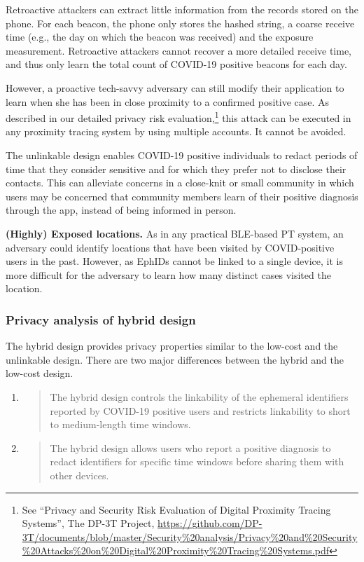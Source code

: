 \documentclass{article}
\begin{document}
Retroactive attackers can extract little information from the records
stored on the phone. For each beacon, the phone only stores the hashed
string, a coarse receive time (e.g., the day on which the beacon was
received) and the exposure measurement. Retroactive attackers cannot
recover a more detailed receive time, and thus only learn the total
count of COVID-19 positive beacons for each day.

However, a proactive tech-savvy adversary can still modify their
application to learn when she has been in close proximity to a confirmed
positive case. As described in our detailed privacy risk
evaluation,\footnote{See ``Privacy and Security Risk Evaluation of
  Digital Proximity Tracing Systems'', The DP-3T Project,
  \href{https://github.com/DP-3T/documents/blob/master/Security\%20analysis/Privacy\%20and\%20Security\%20Attacks\%20on\%20Digital\%20Proximity\%20Tracing\%20Systems.pdf}{{https://github.com/DP-3T/documents/blob/master/Security\%20analysis/Privacy\%20and\%20Security\%20Attacks\%20on\%20Digital\%20Proximity\%20Tracing\%20Systems.pdf}}}
this attack can be executed in any proximity tracing system by using
multiple accounts. It cannot be avoided.

The unlinkable design enables COVID-19 positive individuals to redact
periods of time that they consider sensitive and for which they prefer
not to disclose their contacts. This can alleviate concerns in a
close-knit or small community in which users may be concerned that
community members learn of their positive diagnosis through the app,
instead of being informed in person.

\textbf{(Highly) Exposed locations.} As in any practical BLE-based PT
system, an adversary could identify locations that have been visited by
COVID-positive users in the past. However, as EphIDs cannot be linked to
a single device, it is more difficult for the adversary to learn how
many distinct cases visited the location.


\subsubsection{Privacy analysis of hybrid
design}\label{privacy-analysis-of-hybrid-design}

The hybrid design provides privacy properties similar to the low-cost
and the unlinkable design. There are two major differences between the
hybrid and the low-cost design.

\begin{enumerate}
\def\labelenumi{\arabic{enumi})}
\item
  \begin{quote}
  The hybrid design controls the linkability of the ephemeral
  identifiers reported by COVID-19 positive users and restricts
  linkability to short to medium-length time windows.
  \end{quote}
\item
  \begin{quote}
  The hybrid design allows users who report a positive diagnosis to
  redact identifiers for specific time windows before sharing them with
  other devices.
  \end{quote}
\end{enumerate}
\end{document}
